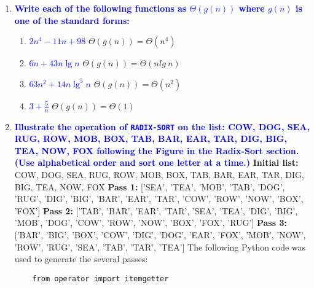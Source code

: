 \documentclass{article}
\begin{document}
\begin{enumerate}
\item \textbf{\textcolor{blue}{Write each of the following functions as $\Theta(g(n))$ where
$g(n)$ is one of the standard forms:}}
    \begin{enumerate}
    \item \textbf{\textcolor{blue}{$2n^4-11n+98$}}
        \newline\newline $\Theta(g(n)) = \Theta(n^4)$
    \item \textbf{\textcolor{blue}{$6n + 43n\lg n$}}
        \newline\newline$\Theta(g(n)) = \Theta(nlg\ n)$\newline
    \item \textbf{\textcolor{blue}{$63n^2 + 14n\lg^5n$}}
        \newline\newline$\Theta(g(n)) = \Theta(n^2)$\newline
    \item \textbf{\textcolor{blue}{$3 + \frac{5}{n}$}}
        \newline\newline$\Theta(g(n)) = \Theta(1)$\newline
    \end{enumerate}

\item \textbf{\textcolor{blue}{Illustrate the operation of {\tt RADIX-SORT} on the
list: COW, DOG, SEA, RUG, ROW, MOB, BOX, TAB, BAR, EAR, TAR, DIG, BIG,
TEA, NOW, FOX following the Figure in the Radix-Sort section.
(Use alphabetical order and sort one letter at a time.)}}
    \newline\newline\textbf{Initial list:} COW, DOG, SEA, RUG, ROW, MOB, BOX, TAB, BAR, EAR, TAR, DIG, BIG, TEA, NOW, FOX
    \newline\textbf{Pass 1:} ['SEA', 'TEA', 'MOB', 'TAB', 'DOG', 'RUG', 'DIG', 'BIG', 'BAR', 'EAR', 'TAR', 'COW', 'ROW', 'NOW', 'BOX', 'FOX']
    \newline\textbf{Pass 2:} ['TAB', 'BAR', 'EAR', 'TAR', 'SEA', 'TEA', 'DIG', 'BIG', 'MOB', 'DOG', 'COW', 'ROW', 'NOW', 'BOX', 'FOX', 'RUG']
    \newline\textbf{Pass 3:} ['BAR', 'BIG', 'BOX', 'COW', 'DIG', 'DOG', 'EAR', 'FOX', 'MOB', 'NOW', 'ROW', 'RUG', 'SEA', 'TAB', 'TAR', 'TEA']
    \newline\newline The following Python code was used to generate the several passes:
    \begin{verbatim}
    from operator import itemgetter
                 

\end{verbatim}
\end{enumerate}
\end{document}

